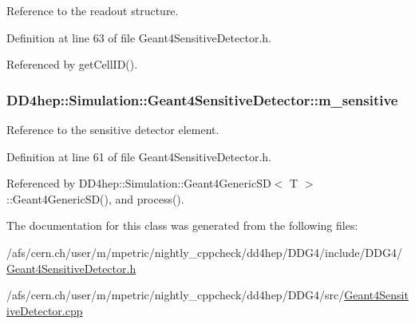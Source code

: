 Reference to the readout structure. 

Definition at line 63 of file Geant4SensitiveDetector.h.

Referenced by getCellID().\hypertarget{class_d_d4hep_1_1_simulation_1_1_geant4_sensitive_detector_a6292e7640bd34206cb682962570a6721}{
\subsubsection[{m\_\-sensitive}]{ {\bf DD4hep::Simulation::Geant4SensitiveDetector::m\_\-sensitive}}}
\label{class_d_d4hep_1_1_simulation_1_1_geant4_sensitive_detector_a6292e7640bd34206cb682962570a6721}


Reference to the sensitive detector element. 

Definition at line 61 of file Geant4SensitiveDetector.h.

Referenced by DD4hep::Simulation::Geant4GenericSD$<$ T $>$::Geant4GenericSD(), and process().

The documentation for this class was generated from the following files:\begin{DoxyCompactItemize}
\item 
/afs/cern.ch/user/m/mpetric/nightly\_\-cppcheck/dd4hep/DDG4/include/DDG4/\hyperlink{_geant4_sensitive_detector_8h}{Geant4SensitiveDetector.h}\item 
/afs/cern.ch/user/m/mpetric/nightly\_\-cppcheck/dd4hep/DDG4/src/\hyperlink{_geant4_sensitive_detector_8cpp}{Geant4SensitiveDetector.cpp}\end{DoxyCompactItemize}
